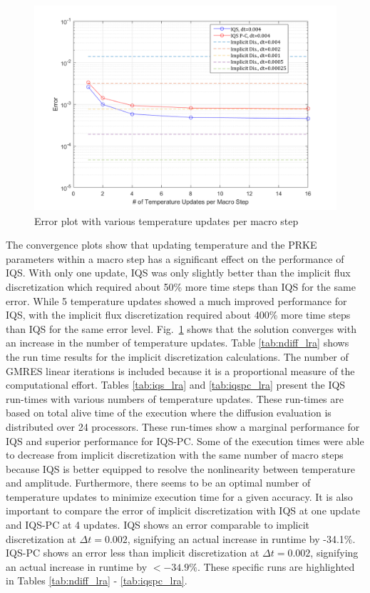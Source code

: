 \documentclass{elsarticle}
\newcommand{\fig}[1]{Fig.~\ref{#1}}                      %
\newcommand{\iqspc}{IQS-PC\xspace}
\begin{document}
\begin{figure}[htbp!]
\centering
\includegraphics[height=3in]{figures/lra_mp.png}
\caption{Error plot with various temperature updates per macro step}
\label{fig:mp}
\end{figure}

The convergence plots show that updating temperature and the PRKE parameters within a macro step has a significant effect on the performance of IQS.  With only one update, IQS was only slightly better than the implicit flux discretization which required about 50\% more time steps than IQS for the same error.  While 5 temperature updates showed a much improved performance for IQS, with the implicit flux discretization required about 400\% more time steps than IQS for the same error level.  \fig{fig:mp} shows that the solution converges with an increase in the number of temperature updates. 
%
Table \ref{tab:ndiff_lra} shows the run time results for the implicit discretization calculations. The number of GMRES linear iterations is included because it is a proportional measure of the computational effort. Tables \ref{tab:iqs_lra} and \ref{tab:iqspc_lra} present the IQS run-times with various numbers of temperature updates.  These run-times are based on total alive time of the execution where the diffusion evaluation is distributed over 24 processors. These run-times show a marginal performance for IQS and superior performance for \iqspc.  Some of the execution times were able to decrease from implicit discretization with the same number of macro steps because IQS is better equipped to resolve the nonlinearity between temperature and amplitude. Furthermore, there seems to be an optimal number of temperature updates to minimize execution time for a given accuracy.
It is also important to compare the error of implicit discretization with IQS at one update and \iqspc at 4 updates.  IQS shows an error comparable to implicit discretization at $\Delta t = 0.002$, signifying an actual increase in runtime by -34.1\%.  \iqspc shows an error less than implicit discretization at $\Delta t = 0.002$, signifying an actual increase in runtime by $<-34.9\%$. These specific runs are highlighted in Tables \ref{tab:ndiff_lra} - \ref{tab:iqspc_lra}.
\end{document}
